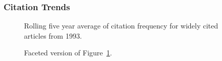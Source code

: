 \documentclass[
  10pt,
  letterpaper,
  DIV=11,
  numbers=noendperiod,
  twoside]{scrartcl}
\begin{document}
\subsubsection*{Citation Trends}\label{citation-trends-17}

\begin{figure}


\caption{\label{fig-citation-spaghetti-1993}Rolling five year average of
citation frequency for widely cited articles from 1993.}

\end{figure}%

\begin{figure}


\caption{\label{fig-citation-facet-1993}Faceted version of
Figure~\ref{fig-citation-spaghetti-1993}.}

\end{figure}%
\end{document}
